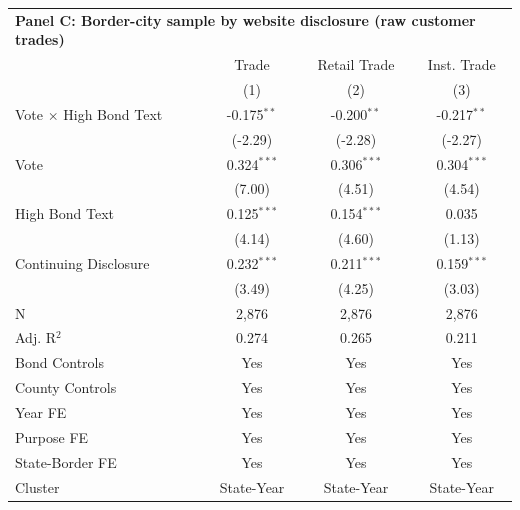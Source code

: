 \begingroup
\centering
\begin{tabular*}{\textwidth}{@{\extracolsep{\fill}}lccc}
\multicolumn{5}{l}{\textbf{Panel C: Border-city sample by website disclosure (raw customer trades)}}\\

\addlinespace
   \toprule
                                 & Trade         & Retail Trade  & Inst. Trade\\  
                                 & (1)           & (2)           & (3)\\  
   \midrule 
   Vote $\times$ High Bond Text  & -0.175$^{**}$ & -0.200$^{**}$ & -0.217$^{**}$\\   
                                 & (-2.29)      & (-2.28)      & (-2.27)\\   
   Vote                          & 0.324$^{***}$ & 0.306$^{***}$ & 0.304$^{***}$\\   
                                 & (7.00)       & (4.51)       & (4.54)\\   
   High Bond Text                & 0.125$^{***}$ & 0.154$^{***}$ & 0.035\\   
                                 & (4.14)       & (4.60)       & (1.13)\\   
   Continuing Disclosure         & 0.232$^{***}$ & 0.211$^{***}$ & 0.159$^{***}$\\   
                                 & (3.49)       & (4.25)       & (3.03)\\   
   \hline
   N                  & 2,876         & 2,876         & 2,876\\  
   Adj. R$^2$                & 0.274         & 0.265         & 0.211\\  
   Bond Controls                 & Yes           & Yes           & Yes\\  
   County Controls               & Yes           & Yes           & Yes\\  
   Year FE                       & Yes           & Yes           & Yes\\  
   Purpose FE                    & Yes           & Yes           & Yes\\  
   State-Border FE               & Yes           & Yes           & Yes\\  
   Cluster              & State-Year & State-Year & State-Year\\  
   \bottomrule
\end{tabular*}
\par\endgroup

